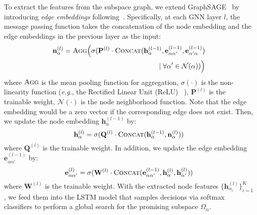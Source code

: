 \documentclass[lettersize,journal]{IEEEtran}
\def\eg{\emph{e.g.}} \def\Eg{\emph{E.g.}}
\begin{document}
{To extract the features from the subspace graph, we extend GraphSAGE~\cite{hamilton2017graphsage} by introducing \emph{edge embeddings} following~\cite{you2020handling}.
Specifically, at each GNN layer $l$, the message passing function takes the concatenation of the node embedding and the edge embeddings in the previous layer as the input:
\begin{equation}
\begin{split}
    \mathbf{n}_{\alpha}^{(l)} = \textsc{Agg}\Big(\sigma(\mathbf{P}^{(l)} \cdot \textsc{Concat}( \mathbf{h}_{\alpha}^{(l-1)},\mathbf{e}_{\alpha\alpha'}^{(l-1)}, \mathbf{e}_{\alpha'\alpha}^{(l-1)})  \\ \mid \forall \alpha'\in \mathcal{N}(\alpha))\Big)
\end{split}
\end{equation}
where $\textsc{Agg}$ is the mean pooling function for aggregation, $\sigma(\cdot)$ is the non-linearity function (\eg, the Rectified Linear Unit (ReLU)~\cite{nair2010rectified} ), $\mathbf{P}^{(l)}$ is the trainable weight, $\mathcal{N}(\cdot)$ is the node neighborhood function.
Note that the edge embedding would be a zero vector if the corresponding edge does not exist.
Then, we update the node embedding $\mathbf{h}_{\alpha}^{(l-1)}$ by:
\begin{equation}
\mathbf{h}_{\alpha}^{(l)} = \sigma(\mathbf{Q}^{(l)} \cdot \textsc{Concat}(\mathbf{h}_{\alpha}^{(l-1)}, \mathbf{n}_{\alpha}^{(l)}))
\end{equation}
where $\mathbf{Q}^{(l)}$ is the trainable weight.
In addition, we update the edge embedding $\mathbf{e}_{\alpha\alpha'}^{(l-1)}$ by:
\begin{equation}
    \mathbf{e}_{\alpha\alpha'}^{(l)} = \sigma(\mathbf{W}^{(l)} \cdot \textsc{Concat}(\mathbf{e}_{\alpha\alpha'}^{(l-1)}, \mathbf{h}_{\alpha}^{(l)}, \mathbf{h}_{\alpha'}^{(l)}))
\end{equation}
where $\mathbf{W}^{(l)}$ is the trainable weight.
With the extracted node features $\{\mathbf{h}_{\alpha_i}^{(l)}\}_{i=1}^{K}$, we feed them into the LSTM model that samples decisions via softmax classifiers to perform a global search for the promising subspace $\Omega_\alpha$.
 }



	
\end{document}

